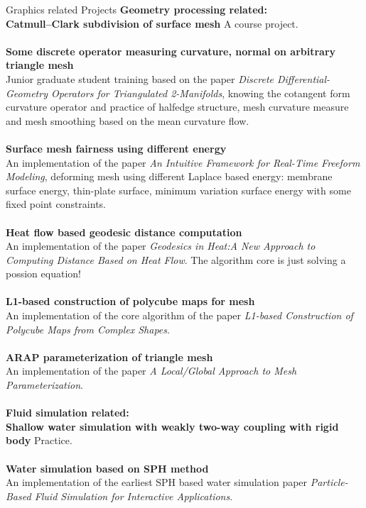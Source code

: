 \documentclass{resume} %
\begin{document}
\begin{rSection}{Graphics related Projects}
         \textbf{Geometry processing related:}\\
                {\bf Catmull–Clark subdivision of surface mesh} A course project.\\\\
                {\bf Some discrete operator measuring  curvature, normal on arbitrary triangle mesh}\\Junior graduate student training based on the paper \emph{Discrete Differential-Geometry Operators for Triangulated 2-Manifolds}, knowing the cotangent form curvature operator and practice of halfedge structure, mesh curvature measure and mesh smoothing based on the mean curvature flow.\\\\
                {\bf Surface mesh fairness using different energy}\\An implementation of the paper \emph{An Intuitive Framework for Real-Time Freeform Modeling}, deforming mesh using different Laplace based energy: membrane surface energy, thin-plate surface, minimum variation surface energy with some fixed point constraints.\\\\
                {\bf Heat flow based geodesic distance computation}\\An implementation of the paper \emph{Geodesics in Heat:A New Approach to Computing Distance Based on Heat Flow}. The algorithm core is just solving a possion equation!\\\\
                {\bf L1-based construction of polycube maps for mesh}\\ An implementation of the core algorithm of the paper \emph{L1-based Construction of Polycube Maps from Complex Shapes}.\\\\
                {\bf ARAP parameterization of triangle mesh}\\An implementation of the paper \emph{A Local/Global Approach to Mesh Parameterization}.\\\\
         \textbf{Fluid simulation related:}\\
                {\bf Shallow water simulation with weakly two-way coupling with rigid body} Practice.\\\\
                {\bf Water simulation based on SPH method}\\An implementation of the earliest SPH based water simulation paper \emph{Particle-Based Fluid Simulation for Interactive Applications}.\\\\                

\end{rSection}
\end{document}
